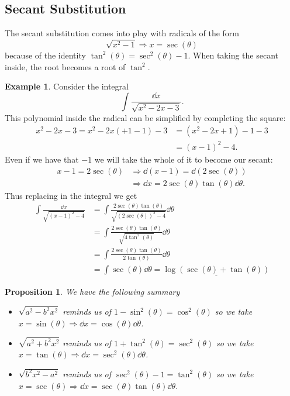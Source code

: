 \documentclass[12pt]{article}
\theoremstyle{plain}
\newtheorem{Prop}[Th]{Proposition}     %
\theoremstyle{definition}
\newtheorem{Ex}[Th]{Example}           %
\theoremstyle{remark}
\newcommand{\te}{\theta}                %
\renewcommand{\:}{\colon}           %
\newcommand{\un}[1]{\underline{#1}}
\renewcommand{\.}{\Cdot}                %
\newcommand{\To}{\Rightarrow}
\begin{document}
\begin{multicols}{2}
\subsection*{Secant Substitution}

The secant substitution comes into play with radicals of the form 
$$\sqrt{x^2-1}\To x=\sec(\te)$$
because of the identity $\tan^2(\te)=\sec^2(\te)-1$. When taking the secant inside, the root becomes a root of $\tan^2$.

\begin{Ex}
  Consider the integral 
  $$\int\frac{\dd x}{\sqrt{x^2-2x-3}}.$$
  This polynomial inside the radical can be simplified by completing the square:
  \begin{align*}
    x^2-2x-3=x^2-2x(+1-1)-3&=(x^2-2x+1)-1-3\\
    &=(x-1)^2-4.
  \end{align*}
  Even if we have that $-1$ we will take the whole of it to become our secant:
  \begin{align*}
    x-1=2\sec(\te)&\To \dd(x-1)=\dd(2\sec(\te))\\
    &\To\dd x=2\sec(\te)\tan(\te)\dd\te.
  \end{align*}
  Thus replacing in the integral we get 
  \begin{align*}
    \int\frac{\dd x}{\sqrt{(x-1)^2-4}}&=\int\frac{2\sec(\te)\tan(\te)}{\sqrt{(2\sec(\te))^2-4}}\dd\te\\
    &=\int\frac{2\sec(\te)\tan(\te)}{\sqrt{4\tan^2(\te)}}\dd\te\\
    &=\int\frac{2\sec(\te)\tan(\te)}{2\tan(\te)}\dd\te\\
    &=\int\sec(\te)\dd\te=\un{\log(\sec(\te)+\tan(\te))}
  \end{align*}
\end{Ex}

\begin{Prop}
  We have the following summary
  \vspace*{-0.5em}
  \begin{itemize}
    \itemsep=-0.2em
    \item $\sqrt{a^2-b^2x^2}$ reminds us of $1-\sin^2(\te)=\cos^2(\te)$ so we take $x=\sin(\te)\To\dd x=\cos(\te)\dd\te$.
    \item $\sqrt{a^2+b^2x^2}$ reminds us of $1+\tan^2(\te)=\sec^2(\te)$ so we take $x=\tan(\te)\To\dd x=\sec^2(\te)\dd\te$.
    \item $\sqrt{b^2x^2-a^2}$ reminds us of $\sec^2(\te)-1=\tan^2(\te)$ so we take $x=\sec(\te)\To\dd x=\sec(\te)\tan(\te)\dd\te$.
  \end{itemize}
\end{Prop}


\end{multicols}
\end{document}
